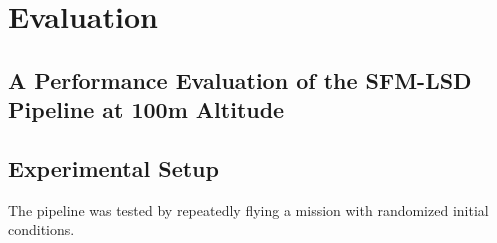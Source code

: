 \chapter{Evaluation}
\label{chapter:evaluation}

\section{A Performance Evaluation of the SFM-LSD Pipeline at 100m Altitude}\label{sec:sfm_lsd_eval}
\section{Experimental Setup}

The pipeline was tested by repeatedly flying a mission with randomized initial conditions.

